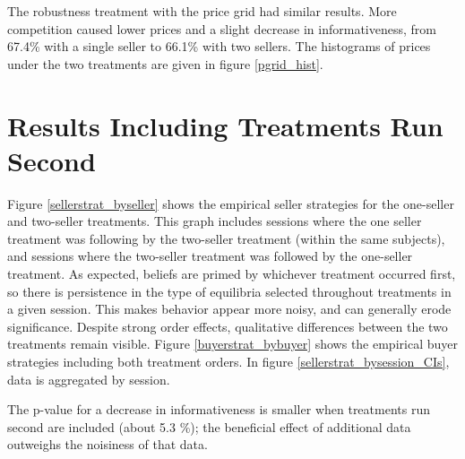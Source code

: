 \documentclass[12pt]{article}
\begin{document}
The robustness treatment with the price grid had similar results. More competition caused lower prices and a slight decrease in informativeness, from 67.4\% with a single seller to 66.1\% with two sellers. The histograms of prices under the two treatments are given in figure \ref{pgrid_hist}.






\section{Results Including Treatments Run Second}







Figure \ref{sellerstrat_byseller} shows the empirical seller strategies for the one-seller and two-seller treatments. This graph includes sessions where the one seller treatment was following by the two-seller treatment (within the same subjects), and sessions where the two-seller treatment was followed by the one-seller treatment. As expected, beliefs are primed by whichever treatment occurred first, so there is persistence in the type of equilibria selected throughout treatments in a given session. This makes behavior appear more noisy, and can generally erode significance. Despite strong order effects, qualitative differences between the two treatments remain visible. Figure \ref{buyerstrat_bybuyer} shows the empirical buyer strategies including both treatment orders. In figure \ref{sellerstrat_bysession_CIs}, data is aggregated by session.



The p-value for a decrease in informativeness is smaller when treatments run second are included (about 5.3 \%); the beneficial effect of additional data outweighs the noisiness of that data.
\end{document}
